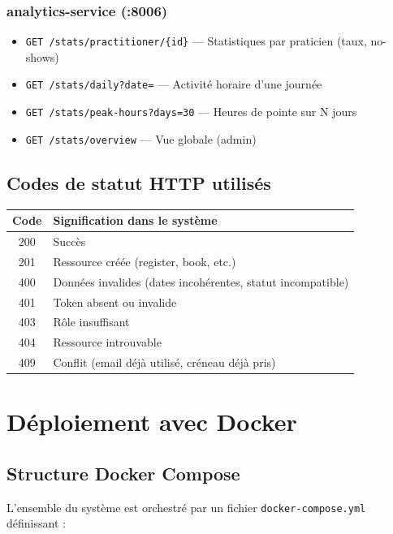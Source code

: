 \documentclass[12pt,a4paper]{article}
\begin{document}
\subsubsection{analytics-service (:8006)}
\begin{itemize}
  \item \texttt{GET /stats/practitioner/\{id\}} — Statistiques par praticien (taux, no-shows)
  \item \texttt{GET /stats/daily?date=} — Activité horaire d'une journée
  \item \texttt{GET /stats/peak-hours?days=30} — Heures de pointe sur N jours
  \item \texttt{GET /stats/overview} — Vue globale (admin)
\end{itemize}

\subsection{Codes de statut HTTP utilisés}

\begin{table}[H]
\centering
\begin{tabular}{cl}
\toprule
\textbf{Code} & \textbf{Signification dans le système} \\
\midrule
200 & Succès \\
201 & Ressource créée (register, book, etc.) \\
400 & Données invalides (dates incohérentes, statut incompatible) \\
401 & Token absent ou invalide \\
403 & Rôle insuffisant \\
404 & Ressource introuvable \\
409 & Conflit (email déjà utilisé, créneau déjà pris) \\
\bottomrule
\end{tabular}
\end{table}

\section{Déploiement avec Docker}

\subsection{Structure Docker Compose}

L'ensemble du système est orchestré par un fichier \texttt{docker-compose.yml} définissant :
\end{document}
